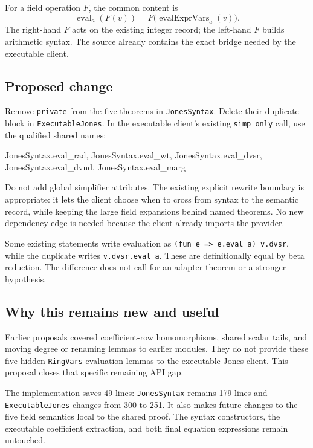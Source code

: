 \documentclass[11pt,letterpaper]{article}
\newcommand{\code}[1]{\nolinkurl{#1}}
\begin{document}
For a field operation $F$, the common content is
\[
  \operatorname{eval}_a(F(v))
    = F\bigl(\operatorname{evalExprVars}_a(v)\bigr).
\]
The right-hand $F$ acts on the existing integer record; the left-hand $F$ builds arithmetic syntax. The source already contains the exact bridge needed by the executable client.

\subsection{Proposed change}

Remove \code{private} from the five theorems in \code{JonesSyntax}. Delete their duplicate block in \code{ExecutableJones}. In the executable client's existing \texttt{simp only} call, use the qualified shared names:

\begin{Lean}
JonesSyntax.eval_rad, JonesSyntax.eval_wt,
JonesSyntax.eval_dvsr, JonesSyntax.eval_dvnd,
JonesSyntax.eval_marg
\end{Lean}

Do not add global simplifier attributes. The existing explicit rewrite boundary is appropriate: it lets the client choose when to cross from syntax to the semantic record, while keeping the large field expansions behind named theorems. No new dependency edge is needed because the client already imports the provider.

Some existing statements write evaluation as \texttt{(fun e => e.eval a) v.dvsr}, while the duplicate writes \texttt{v.dvsr.eval a}. These are definitionally equal by beta reduction. The difference does not call for an adapter theorem or a stronger hypothesis.

\subsection{Why this remains new and useful}

Earlier proposals covered coefficient-row homomorphisms, shared scalar tails, and moving degree or renaming lemmas to earlier modules. They do not provide these five hidden \code{RingVars} evaluation lemmas to the executable Jones client. This proposal closes that specific remaining API gap.

The implementation saves 49 lines: \code{JonesSyntax} remains 179 lines and \code{ExecutableJones} changes from 300 to 251. It also makes future changes to the five field semantics local to the shared proof. The syntax constructors, the executable coefficient extraction, and both final equation expressions remain untouched.
\end{document}
